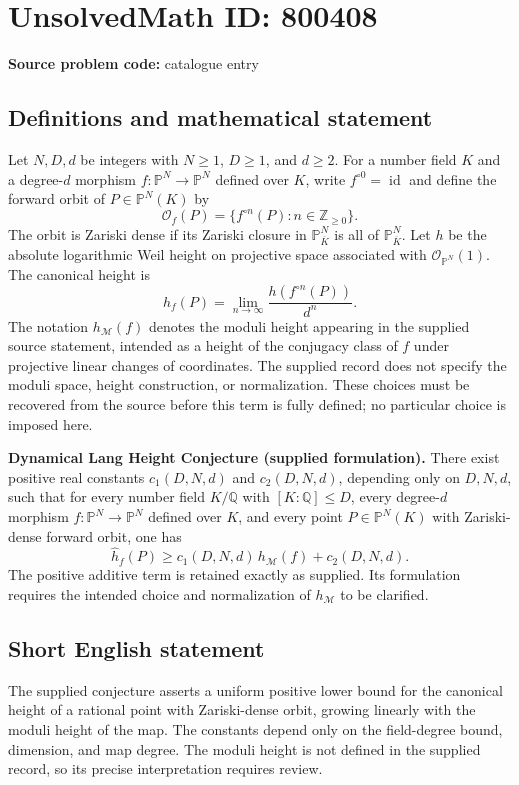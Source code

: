 \documentclass[11pt]{article}
\newcommand{\Z}{\mathbb{Z}}
\newcommand{\Q}{\mathbb{Q}}
\newcommand{\PP}{\mathbb{P}}
\begin{document}
\section*{UnsolvedMath ID: 800408}
\textbf{Source problem code:} catalogue entry
\subsection{Definitions and mathematical statement}
Let \(N,D,d\) be integers with \(N\ge 1\), \(D\ge 1\), and \(d\ge 2\). For a number field \(K\) and a degree-\(d\) morphism \(f:\PP^N\to\PP^N\) defined over \(K\), write \(f^{\circ 0}=\operatorname{id}\) and define the forward orbit of \(P\in\PP^N(K)\) by
\[
\mathcal O_f(P)=\{f^{\circ n}(P):n\in\Z_{\ge 0}\}.
\]
The orbit is Zariski dense if its Zariski closure in \(\PP^N_{\overline K}\) is all of \(\PP^N_{\overline K}\). Let \(h\) be the absolute logarithmic Weil height on projective space associated with \(\mathcal O_{\PP^N}(1)\). The canonical height is
\[
\widehat h_f(P)=\lim_{n\to\infty}\frac{h(f^{\circ n}(P))}{d^n}.
\]
The notation \(h_{\mathcal M}(f)\) denotes the moduli height appearing in the supplied source statement, intended as a height of the conjugacy class of \(f\) under projective linear changes of coordinates. The supplied record does not specify the moduli space, height construction, or normalization. These choices must be recovered from the source before this term is fully defined; no particular choice is imposed here.

\textbf{Dynamical Lang Height Conjecture (supplied formulation).} There exist positive real constants \(c_1(D,N,d)\) and \(c_2(D,N,d)\), depending only on \(D,N,d\), such that for every number field \(K/\Q\) with \([K:\Q]\le D\), every degree-\(d\) morphism \(f:\PP^N\to\PP^N\) defined over \(K\), and every point \(P\in\PP^N(K)\) with Zariski-dense forward orbit, one has
\[
\widehat h_f(P)\ge c_1(D,N,d)\,h_{\mathcal M}(f)+c_2(D,N,d).
\]
The positive additive term is retained exactly as supplied. Its formulation requires the intended choice and normalization of \(h_{\mathcal M}\) to be clarified.
\subsection{Short English statement}
The supplied conjecture asserts a uniform positive lower bound for the canonical height of a rational point with Zariski-dense orbit, growing linearly with the moduli height of the map. The constants depend only on the field-degree bound, dimension, and map degree. The moduli height is not defined in the supplied record, so its precise interpretation requires review.
\end{document}
